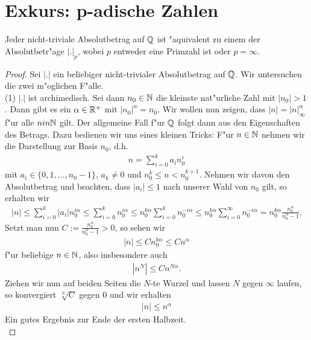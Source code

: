 \section{Exkurs: p-adische Zahlen}
	\begin{satz}[Ostrowski]
		Jeder nicht-triviale Absolutbetrag auf $\mathbb{Q}$ ist "aquivalent zu einem der Absolutbetr"age $|.|_p$, wobei $p$ entweder eine Primzahl ist oder $p=\infty$.
	\end{satz}
	\begin{proof}
		Sei $|.|$ ein beliebiger nicht-trivialer Absolutbetrag auf $\mathbb{Q}$. Wir untersuchen die zwei m"oglichen F"alle.\\
		
		(1) $|.|$ ist archimedisch.
		Sei dann $n_0\in \mathbb{N}$ die kleinste nat"urliche Zahl mit $|n_0| > 1$.
		Dann gibt es ein $\alpha \in \mathbb{R}^+$ mit $|n_0|^{\alpha}=n_0$.
		Wir wollen nun zeigen, dass $|n|=|n|_\infty^\alpha$ f"ur alle $n in \mathbb{N}$ gilt. Der allgemeine Fall f"ur $\mathbb{Q}$ folgt dann aus den Eigenschaften des Betrags.
		Dazu bedienen wir uns eines kleinen Tricks: F"ur $n \in \mathbb{N}$ nehmen wir die Darstellung zur Basis $n_0$, d.h.
		\begin{align*}
			n = \sum_{i=0}^{k} a_i n_0^i
		\end{align*}
		mit $a_i \in \{0,1,\dots,n_0-1\}$, $a_k \neq 0$ und $n_0^k\leq n < n_0^{k+1}$. Nehmen wir davon den Absolutbetrag und beachten, dass $|a_i|\leq 1$ nach unserer Wahl von $n_0$ gilt, so erhalten wir
		\begin{align*}
			|n| \leq \sum_{i=0}^{k} |a_i| n_0^{i\alpha}
				\leq \sum_{i=0}^{k} n_0^{i\alpha}
				\leq n_0^{k\alpha}\sum_{i=0}^{k} n_0^{-i\alpha}
				\leq n_0^{k\alpha}\sum_{i=0}^{\infty} n_0^{-i\alpha}
				 = n_0^{k\alpha} \frac{n_0^\alpha}{n_0^\alpha - 1}.
		\end{align*}
		Setzt man nun $C:=\frac{n_0^\alpha}{n_0^\alpha - 1}>0$, so sehen wir
		\begin{align*}
			|n|\leq C n_0^{k\alpha}\leq C n^\alpha
		\end{align*}
		f"ur beliebige $n \in \mathbb{N}$, also insbesondere auch
		\begin{align*}
			|n^N|\leq C n^{N\alpha}.
		\end{align*}
		Ziehen wir nun auf beiden Seiten die $N$-te Wurzel und lassen $N$ gegen $\infty$ laufen, so konvergiert $\sqrt[N]{C}$ gegen $0$ und wir erhalten 
		\begin{align*}
			|n| \leq n^\alpha
		\end{align*}
		Ein gutes Ergebnis zur Ende der ersten Halbzeit. \\

\end{proof}
